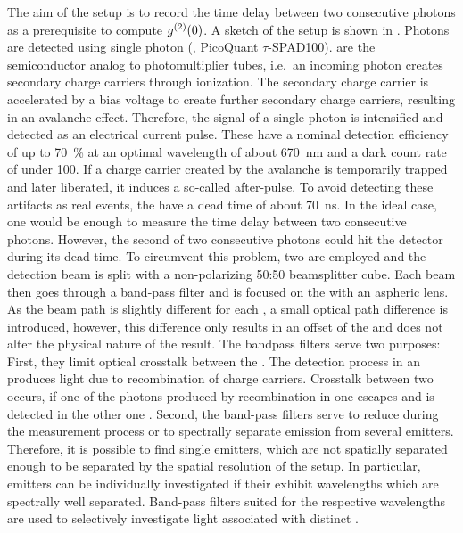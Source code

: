 		The aim of the \hbt setup is to record the time delay between two consecutive photons as a prerequisite to compute $g^{(2)}(0)$.
		A sketch of the \hbt setup is shown in .
		Photons are detected using single photon \apds (\APDs, PicoQuant $\tau${}-SPAD100).
		\APDs are the semiconductor analog to photomultiplier tubes, i.e.\ an incoming photon creates secondary charge carriers through ionization.
		The secondary charge carrier is accelerated by a bias voltage to create further secondary charge carriers, resulting in an avalanche effect.
		Therefore, the signal of a single photon is intensified and detected as an electrical current pulse.
		These \apds have a nominal detection efficiency of up to \SI{70}{\percent} at an optimal wavelength of about \SI{670}{\nm} and a dark count rate of under \SI{100}{\cps}.
		If a charge carrier created by the avalanche is temporarily trapped and later liberated, it induces a so-called after-pulse.
		To avoid detecting these artifacts as real events, the \APDs have a dead time of about \SI{70}{\ns}.
		In the ideal case, one \APD would be enough to measure the time delay between two consecutive photons.
		However, the second of two consecutive photons could hit the detector during its dead time.
		To circumvent this problem, two \APDs are employed and the detection beam is split with a non-polarizing 50:50 beamsplitter cube.
		Each beam then goes through a band-pass filter and is focused on the \apd with an aspheric lens.
		As the beam path is slightly different for each \APD, a small optical path difference is introduced, however, this difference only results in an offset of the \gtf and does not alter the physical nature of the result.
		The bandpass filters serve two purposes:
		First, they limit optical crosstalk between the \apds.
		The detection process in an \apd produces light due to recombination of charge carriers.
		Crosstalk between two \apds occurs, if one of the photons produced by recombination in one \apd escapes and is detected in the other one \cite{Younger2009}.
		Second, the band-pass filters serve to reduce \bkg during the \gt measurement process or to spectrally separate emission from several emitters.
		Therefore, it is possible to find single emitters, which are not spatially separated enough to be separated by the spatial resolution of the setup.
		In particular, emitters can be individually investigated if their \ZPLs exhibit wavelengths which are spectrally well separated.
		Band-pass filters suited for the respective wavelengths are used to selectively investigate light associated with distinct \ZPLs.
